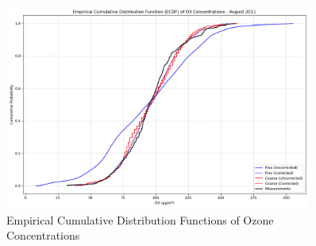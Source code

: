 \documentclass[12pt,a4paper]{article}
\begin{document}
\begin{figure}[H]
    \centering
    \includegraphics[width=0.9\textwidth]{o3_ecdf_comparison_august_2011.png}
    \caption{Empirical Cumulative Distribution Functions of Ozone Concentrations}
\end{figure}
\end{document}
